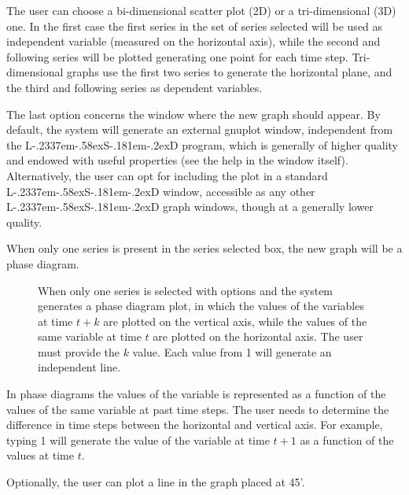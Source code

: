 \documentclass [11pt,a4paper] {book}
\def\LsD{{L\kern-.2337em\lower-.58ex\hbox{S}\kern-.181em\lower-.2ex\hbox{D}}\xspace}
\begin{document}
The user can choose a bi-dimensional scatter plot (2D) or a tri-dimensional (3D) one. In the first case the first series in the set of series selected will be used as independent variable (measured on the horizontal axis), while the second and following series will be plotted generating one point for each time step. Tri-dimensional graphs use the first two series to generate the horizontal plane, and the third and following series as dependent variables.

The last option concerns the window where the new graph should appear. By default, the system will generate an external gnuplot window, independent from the \LsD program, which is generally of higher quality and endowed with useful properties (see the help in the window itself). Alternatively, the user can opt for including the plot in a standard \LsD window, accessible as any other \LsD graph windows, though at a generally lower quality. 


When only one series is present in the series selected box, the new graph will be a phase diagram.
\begin{figure}[ht]
  \centering
  \caption{\small When only one series is selected with options  and  the system generates a phase diagram plot, in which the values of the variables at time $t+k$ are plotted on the vertical axis, while the values of the same variable at time $t$ are plotted on the horizontal axis. The user must provide the $k$ value. Each value from 1 will generate an independent line.}
  \label{fig:phasedia}
\end{figure}

In phase diagrams the values of the variable is represented as a function of the values of the same variable at past time steps. The user needs to determine the difference in time steps between the horizontal and vertical axis. For example, typing 1 will generate the value of the variable at time $t+1$ as a function of the values at time $t$.

Optionally, the user can plot a line in the graph placed at 45'. 
\end{document}
